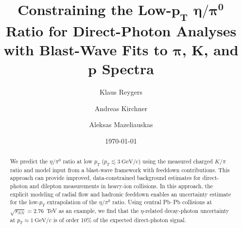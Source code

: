 \documentclass[%
 reprint,
 amsmath,amssymb,
 aps,
prc,
]{revtex4-2}
\begin{document}
\title{\texorpdfstring{Constraining the Low-$\bm{p_T}$ $\bm{\eta/\pi^0}$ Ratio for Direct-Photon Analyses with Blast-Wave Fits to $\bm{\pi}$, $\bm{K}$, and $\bm{p}$ Spectra}{Constraining the Low-p\_T eta/pi0 Ratio for Direct-Photon Analyses with Blast-Wave Fits to pi, K, and p Spectra}}%

\author{Klaus Reygers}%
\author{Andreas Kirchner}
\author{Aleksas Mazeliauskas}%



\date{\today}%

\begin{abstract}
We predict the $\eta/\pi^0$ ratio at low $p_T$ ($p_T \lesssim 3~\mathrm{GeV}/c$) using the measured charged $K/\pi$ ratio and model input from a blast-wave framework with feeddown contributions. This approach can provide improved, data-constrained background estimates for direct-photon and dilepton measurements in heavy-ion collisions. In this approach, the explicit modeling of radial flow and hadronic feeddown enables an uncertainty estimate for the low-$p_T$ extrapolation of the $\eta/\pi^0$ ratio. Using central Pb--Pb collisions at $\sqrt{s_{NN}}=2.76$~TeV as an example, we find that the $\eta$-related decay-photon uncertainty at $p_T \approx 1~\mathrm{GeV}/c$ is of order 10\% of the expected direct-photon signal.
\end{abstract}

\maketitle
\end{document}
